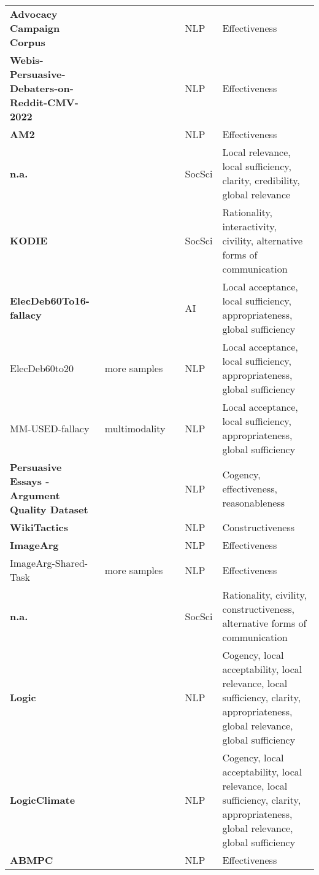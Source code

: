 {\begin{longtable}{P{4.1cm}P{1.9cm}P{3cm}P{1cm}p{4cm}}
\textbf{Advocacy Campaign Corpus} && \citet{kornilova-etal-2022-item} & NLP & Effectiveness\\
\textbf{Webis-Persuasive-Debaters-on-Reddit-CMV-2022} && \citet{wiegmann-etal-2022-analyzing} &  NLP & Effectiveness\\
\textbf{AM2} && \citet{chen-etal-2022-argument} & NLP & Effectiveness\\
\textbf{n.a.} && \citet{musi2022fake} & SocSci & Local relevance, local sufficiency, clarity, credibility, global relevance\\
\textbf{KODIE} && \citet{heinbach2022effects} & SocSci & Rationality, interactivity, civility, alternative forms of communication\\
\textbf{ElecDeb60To16-fallacy} & & \citet{ijcai2022p575} & AI & Local acceptance, local sufficiency, appropriateness, global sufficiency\\
ElecDeb60to20 & more samples & \citet{goffredo-etal-2023-argument} & NLP & Local acceptance, local sufficiency, appropriateness, global sufficiency\\
MM-USED-fallacy & multimodality & \citet{mancini-etal-2024-multimodal} & NLP & Local acceptance, local sufficiency, appropriateness, global sufficiency\\
\textbf{Persuasive Essays - Argument Quality Dataset} && \citet{marro-etal-2022-graph} & NLP & Cogency, effectiveness, reasonableness\\
\textbf{WikiTactics} && \citet{de-kock-vlachos-2022-disagree} & NLP & Constructiveness\\
\textbf{ImageArg} && \citet{liu-etal-2022-imagearg} & NLP & Effectiveness\\
ImageArg-Shared-Task & more samples & \citet{liu-etal-2023-overview} & NLP & Effectiveness\\
\textbf{n.a.} && \citet{2022:esau:kommunikat} & SocSci & Rationality, civility, constructiveness, alternative forms of communication\\
\textbf{Logic} && \citet{jin-etal-2022-logical} & NLP & Cogency, local acceptability, local relevance, local sufficiency, clarity, appropriateness, global relevance, global sufficiency\\
\textbf{LogicClimate} && \citet{jin-etal-2022-logical} & NLP & Cogency, local acceptability, local relevance, local sufficiency, clarity, appropriateness, global relevance, global sufficiency\\
\textbf{ABMPC} && \citet{wambsganss-niklaus-2022-modeling} & NLP & Effectiveness\\

\end{longtable}}
